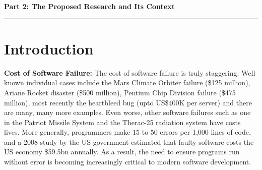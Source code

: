 \documentclass[a4paper,11pt]{article}
\begin{document}
\newpage

\noindent
{\bf \Large Part 2: The Proposed Research and Its Context}

\vspace*{-0.23in}

\begin{center}
\rule{170mm}{.5mm}
\end{center}

\vspace*{-0.3in}

\section{Introduction}\label{sec:intro}

\vspace*{-0.1in} 

{\bf Cost of Software Failure:} The cost of software failure is truly
staggering. Well known individual cases include the Mars Climate
Orbiter failure (\$125 million), Ariane Rocket disaster (\$500
million), Pentium Chip Division failure (\$475 million), most recently
the heartbleed bug (upto US\$400K per server) and there are
many, many more examples. Even worse, other software failures such as
one in the Patriot Missile System and the Therac-25 radiation system
have costs lives. More generally, programmers make 15 to 50 errors per
1,000 lines of code, and a 2008 study by the US government estimated
that faulty software costs the US economy \$59.5bn annually.  As a
result, the need to ensure programs run without error is becoming
increasingly critical to modern software development.

\end{document}
